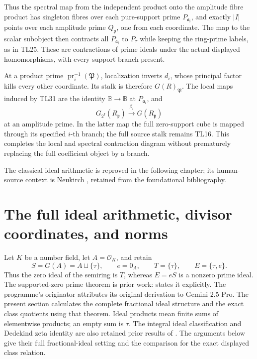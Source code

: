 \documentclass[11pt,a4paper]{article}
\theoremstyle{definition}\newtheorem{definition}[theorem]{Definition}
\begin{document}
Thus the spectral map from the independent product onto the amplitude
fibre product has singleton fibres over each pure-support prime
\(P_{\mathfrak a_i}\), and exactly \(|I|\) points over each amplitude
prime \(Q_{\mathfrak p}\), one from each coordinate. The map to the
scalar subobject then contracts all \(P_{\mathfrak a_i}\) to \(P_\tau\)
while keeping the ring-prime labels, as in TL25. These are contractions
of prime ideals under the actual displayed homomorphisms, with every
support branch present.

At a product prime \(\operatorname{pr}_i^{-1}(\mathfrak P)\),
localization inverts \(d_i\), whose principal factor kills every other
coordinate. Its stalk is therefore \(G(R)_{\mathfrak P}\). The local
maps induced by TL31 are the identity \(\mathbb B\to\mathbb B\) at
\(P_{\mathfrak a_i}\), and \[
 G_{2^I}(R_{\mathfrak p})\xrightarrow{\beta_i}G(R_{\mathfrak p})
 \tag{TL32}
\] at an amplitude prime. In the latter map the full zero-support cube
is mapped through its specified \(i\)-th branch; the full source stalk
remains TL16. This completes the local and spectral contraction diagram
without prematurely replacing the full coefficient object by a branch.

The classical ideal arithmetic is reproved in the following chapter; its human-source context is Neukirch \cite{neukirch}, retained from the foundational bibliography.
\section{The full ideal arithmetic, divisor coordinates, and norms}
\label{sec:sz-divisors}

Let \(K\) be a number field, let \(A=\mathcal O_K\), and retain
\[
 S=G(A)=A\sqcup\{\tau\},\qquad e=0_A,\qquad
 T=\{\tau\},\qquad E=\{\tau,e\}.
\]
Thus the zero ideal of the semiring is \(T\), whereas \(E=eS\) is a
nonzero prime ideal. The supported-zero prime theorem is prior work:
\cite[\texttt{thm:zero-prime-not-irr}]{globalization} states it explicitly.
The programme's originator attributes its original derivation to
Gemini 2.5 Pro. The present section calculates the complete fractional
ideal structure and the exact class quotients using that theorem.
Ideal products mean finite sums of elementwise products; an empty
sum is \(\tau\).
The integral ideal classification and Dedekind zeta identity are also
retained prior results of
\cite[\texttt{thm:OK-ideals-spectrum}, \texttt{thm:Dedekind-zeta}]{globalization}.
The arguments below give their full fractional-ideal setting and
the comparison for the exact displayed class relation.
\end{document}

